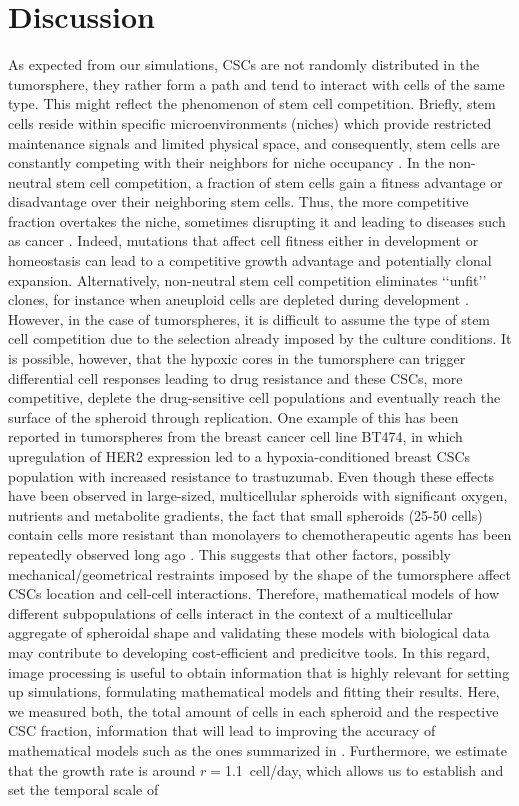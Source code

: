 \documentclass[fleqn,10pt]{wlscirep}
\begin{document}
\section*{Discussion}

As expected from our simulations, CSCs are not randomly distributed in the tumorsphere, they rather form a path and tend to interact with cells of the same type. This might reflect the phenomenon of stem cell competition. Briefly, stem cells reside within specific microenvironments (niches) which provide restricted maintenance signals and limited physical space, and consequently, stem cells are constantly competing with their neighbors for niche occupancy \cite{Stines2013}. In the non-neutral stem cell competition, a fraction of stem cells gain a fitness advantage or disadvantage over their neighboring stem cells. Thus, the more competitive fraction overtakes the niche, sometimes disrupting it and leading to diseases such as cancer \cite{Johnston2009}. Indeed, mutations that affect cell fitness either in development or homeostasis can lead to a competitive growth advantage and potentially clonal expansion. Alternatively, non-neutral stem cell competition eliminates ‘‘unfit’’ clones, for instance when aneuploid cells are depleted during development \cite{Derks2023}. However, in the case of tumorspheres, it is difficult to assume the type of stem cell competition due to the selection already imposed by the culture conditions. It is possible, however, that the hypoxic cores in the tumorsphere can trigger differential cell responses leading to drug resistance \cite{Fisher2020} and these CSCs, more competitive, deplete the drug-sensitive cell populations and eventually reach the surface of the spheroid through replication. One example of this has been reported in tumorspheres from the breast cancer cell line BT474, in which upregulation of HER2 expression led to a hypoxia-conditioned breast CSCs population with increased resistance to trastuzumab\cite{Rodriguez2018}. Even though these effects have been observed in large-sized, multicellular spheroids with significant oxygen, nutrients and metabolite gradients, the fact that small spheroids (25-50 cells) contain cells more resistant than monolayers to chemotherapeutic agents has been repeatedly observed long ago \cite{Olive1994}. This suggests that other factors, possibly mechanical/geometrical restraints imposed by the shape of the tumorsphere affect CSCs location and cell-cell interactions. Therefore, mathematical models of how different subpopulations of cells interact in the context of a multicellular aggregate of spheroidal shape and validating these models with biological data may contribute to developing cost-efficient and predicitve tools. In this regard, image processing is useful to obtain information that is highly relevant for setting up simulations, formulating mathematical models and fitting their results. Here, we measured both, the total amount of cells in each spheroid and the respective CSC fraction, information that will lead to improving the accuracy of mathematical models such as the ones summarized in \cite{barberis2021diff}. Furthermore, we estimate that the growth rate is around $r=$\SI{1.1}{cell/day}, which allows us to establish and set the temporal scale of 
\end{document}
